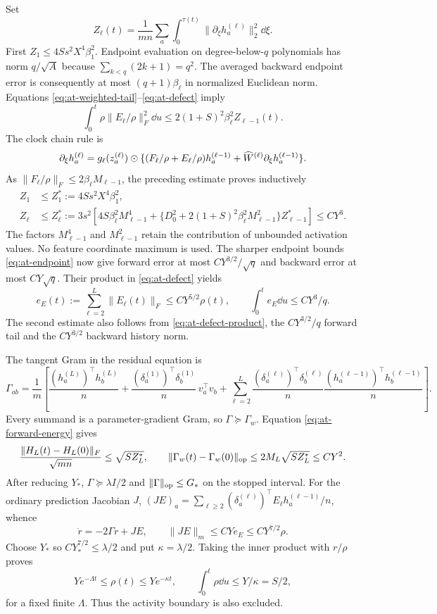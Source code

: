 Set
\[
 Z_\ell(t)=\frac1{mn}\sum_a\int_0^{\tau(t)}
       \|\partial_\xi h_a^{(\ell)}\|_2^2\dd\xi.
\]
First $Z_1\le4Ss^2X^4\beta_1^2$.
Endpoint evaluation on degree-below-$q$ polynomials has norm
$q/\sqrt A$ because $\sum_{k<q}(2k+1)=q^2$.
The averaged backward endpoint error is consequently at most
$(q+1)\beta_\ell$ in normalized Euclidean norm.  Equations
\eqref{eq:at-weighted-tail}--\eqref{eq:at-defect} imply
\[
 \int_0^t\rho\|E_\ell/\rho\|_F^2\dd u
 \le2(1+S)^2\beta_\ell^2 Z_{\ell-1}(t).
\]
The clock chain rule is
\[
 \partial_\xi h_a^{(\ell)}=g_\ell(z_a^{(\ell)})\mathbin{\odot}
 \{(F_\ell/\rho+E_\ell/\rho)h_a^{(\ell-1)}
                   +\widehat W^{(\ell)}\partial_\xi h_a^{(\ell-1)}\}.
\]
As $\|F_\ell/\rho\|_F\le2\beta_\ell M_{\ell-1}$, the preceding
estimate proves inductively
\begin{align}
 Z_1&\le Z_1^*:=4Ss^2X^4\beta_1^2,\nonumber\\
 Z_\ell&\le Z_\ell^*:=3s^2\left[
 4S\beta_\ell^2M_{\ell-1}^4+
 \{D_0^2+2(1+S)^2\beta_\ell^2M_{\ell-1}^2\}Z_{\ell-1}^*\right]
 \le CY^3.
 \label{eq:at-forward-energy}
\end{align}
The factors $M_{\ell-1}^4$ and $M_{\ell-1}^2$ retain the contribution
of unbounded activation values.  No feature coordinate maximum is used.
The sharper endpoint bounds \eqref{eq:at-endpoint} now give forward
error at most $CY^{3/2}/\sqrt q$ and backward error at most
$CY\sqrt q$.  Their product in \eqref{eq:at-defect} yields
\begin{equation}
 e_E(t):=\sum_{\ell=2}^L\|E_\ell(t)\|_F
 \le CY^{5/2}\rho(t),\qquad
 \int_0^t e_E\dd u\le CY^3/q.
 \label{eq:at-relative-defect}
\end{equation}
The second estimate also follows from \eqref{eq:at-defect-product},
the $C Y^{3/2}/q$ forward tail and the $C Y^{3/2}$ backward history norm.

The tangent Gram in the residual equation is
\begin{equation}
 \Gamma_{ab}=\frac1m\left[
 \frac{(h_a^{(L)})^\top h_b^{(L)}}n+
 \frac{(\delta_a^{(1)})^\top\delta_b^{(1)}}n\,v_a^\top v_b+
 \sum_{\ell=2}^L
 \frac{(\delta_a^{(\ell)})^\top\delta_b^{(\ell)}}n
 \frac{(h_a^{(\ell-1)})^\top h_b^{(\ell-1)}}n\right].
 \label{eq:at-tangent-gram}
\end{equation}
Every summand is a parameter-gradient Gram, so $\Gamma\succeq\Gamma_w$.
Equation \eqref{eq:at-forward-energy} gives
\[
 \frac{\|H_L(t)-H_L(0)\|_F}{\sqrt{mn}}\le\sqrt{SZ_L^*},\qquad
 \|\Gamma_w(t)-\Gamma_w(0)\|_{\rm op}
       \le2M_L\sqrt{SZ_L^*}\le CY^2.
\]
After reducing $Y_*$, $\Gamma\succeq\lambda I/2$ and
$\|\Gamma\|_{\rm op}\le G_*$ on the stopped interval.
For the ordinary prediction Jacobian $J$,
$(JE)_a=\sum_{\ell\ge2}(\delta_a^{(\ell)})^\top E_\ell
h_a^{(\ell-1)}/n$, whence
\[
 \dot r=-2\Gamma r+JE,\qquad
 \|JE\|_m\le CY e_E\le CY^{7/2}\rho.
\]
Choose $Y_*$ so $CY_*^{7/2}\le\lambda/2$ and put $\kappa=\lambda/2$.
Taking the inner product with $r/\rho$ proves
\begin{equation}
 Y e^{-\Lambda t}\le\rho(t)\le Ye^{-\kappa t},\qquad
 \int_0^t\rho\dd u\le Y/\kappa=S/2,
 \label{eq:at-fitting}
\end{equation}
for a fixed finite $\Lambda$.  Thus the activity boundary is also excluded.

